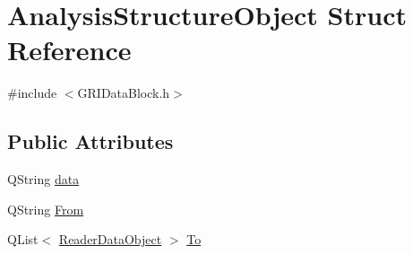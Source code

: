 \hypertarget{structAnalysisStructureObject}{\section{\-Analysis\-Structure\-Object \-Struct \-Reference}
\label{structAnalysisStructureObject}
}


{\ttfamily \#include $<$\-G\-R\-I\-Data\-Block.\-h$>$}

\subsection*{\-Public \-Attributes}
\begin{DoxyCompactItemize}
\item 
\-Q\-String \hyperlink{structAnalysisStructureObject_a4388b9dbd88213d4b176927438045c26}{data}
\item 
\-Q\-String \hyperlink{structAnalysisStructureObject_ad289308454d692c259c6877aec9f5832}{\-From}
\item 
\-Q\-List$<$ \hyperlink{structReaderDataObject}{\-Reader\-Data\-Object} $>$ \hyperlink{structAnalysisStructureObject_a6b59b01dfd6487ea3ba391e5bdd5a033}{\-To}
\end{DoxyCompactItemize}


